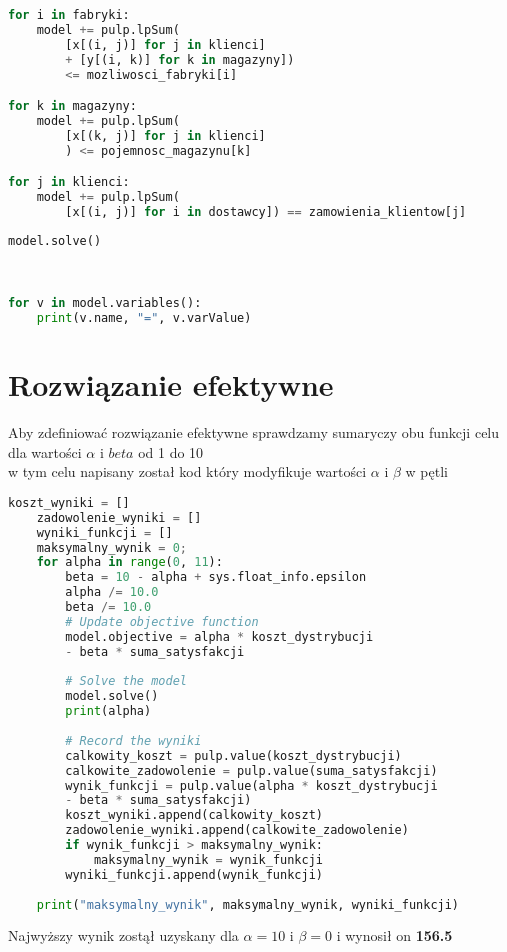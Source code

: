 \documentclass[12pt]{article}
\begin{document}
\begin{lstlisting}[language=Python, caption={Ograniczenia}]
for i in fabryki:
    model += pulp.lpSum(
        [x[(i, j)] for j in klienci]
        + [y[(i, k)] for k in magazyny])
        <= mozliwosci_fabryki[i]

for k in magazyny:
    model += pulp.lpSum(
        [x[(k, j)] for j in klienci]
        ) <= pojemnosc_magazynu[k]

for j in klienci:
    model += pulp.lpSum(
        [x[(i, j)] for i in dostawcy]) == zamowienia_klientow[j]
\end{lstlisting}

\begin{lstlisting}[language=Python, caption={Rozwiązanie problemu}]
    model.solve()
\end{lstlisting}
\

\begin{lstlisting}[language=Python, caption={Przedstawienie wyników}]
for v in model.variables():
    print(v.name, "=", v.varValue)
\end{lstlisting}

\section{Rozwiązanie efektywne}
Aby zdefiniować rozwiązanie efektywne sprawdzamy sumaryczy obu funkcji celu dla wartości $\alpha$ i $beta$ od 1 do 10 \\ 
w tym celu napisany został kod który modyfikuje wartości $\alpha$ i $\beta$ w pętli 

\begin{lstlisting}[language=Python, caption={Wyznaczanie alpha i beta}]
    koszt_wyniki = []
    zadowolenie_wyniki = []
    wyniki_funkcji = []
    maksymalny_wynik = 0;
    for alpha in range(0, 11):
        beta = 10 - alpha + sys.float_info.epsilon
        alpha /= 10.0
        beta /= 10.0
        # Update objective function
        model.objective = alpha * koszt_dystrybucji
        - beta * suma_satysfakcji
    
        # Solve the model
        model.solve()
        print(alpha)
    
        # Record the wyniki
        calkowity_koszt = pulp.value(koszt_dystrybucji)
        calkowite_zadowolenie = pulp.value(suma_satysfakcji)
        wynik_funkcji = pulp.value(alpha * koszt_dystrybucji
        - beta * suma_satysfakcji)
        koszt_wyniki.append(calkowity_koszt)
        zadowolenie_wyniki.append(calkowite_zadowolenie)
        if wynik_funkcji > maksymalny_wynik:
            maksymalny_wynik = wynik_funkcji
        wyniki_funkcji.append(wynik_funkcji)
        
    print("maksymalny_wynik", maksymalny_wynik, wyniki_funkcji)

\end{lstlisting}
Najwyższy wynik zostął uzyskany dla $\alpha = 10$ i $\beta = 0$ i wynosił on \textbf{156.5}
\end{document}
